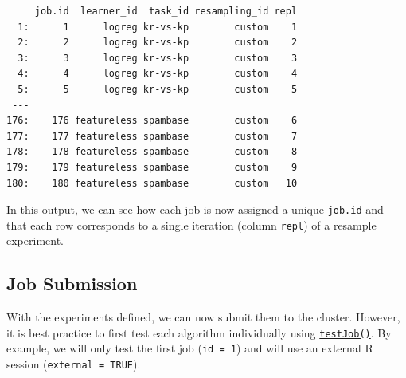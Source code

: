 \begin{Shaded}
\begin{Highlighting}[]
\OtherTok{=} \NormalTok{(}
\OtherTok{=} 
\OtherTok{=}\NormalTok{ job\_table[,}
\NormalTok{]}

\end{Highlighting}
\end{Shaded}

\begin{verbatim}
     job.id  learner_id  task_id resampling_id repl
  1:      1      logreg kr-vs-kp        custom    1
  2:      2      logreg kr-vs-kp        custom    2
  3:      3      logreg kr-vs-kp        custom    3
  4:      4      logreg kr-vs-kp        custom    4
  5:      5      logreg kr-vs-kp        custom    5
 ---                                               
176:    176 featureless spambase        custom    6
177:    177 featureless spambase        custom    7
178:    178 featureless spambase        custom    8
179:    179 featureless spambase        custom    9
180:    180 featureless spambase        custom   10
\end{verbatim}

In this output, we can see how each job is now assigned a unique
\texttt{job.id} and that each row corresponds to a single iteration
(column \texttt{repl}) of a resample experiment.

\hypertarget{sec-batchtools-submission}{%
\subsection{Job Submission}\label{sec-batchtools-submission}}

With the experiments defined, we can now submit them to the cluster.
However, it is best practice to first test each algorithm individually
using
\href{https://www.rdocumentation.org/packages/batchtools/topics/testJob}{\texttt{testJob()}}.
By example, we will only test the first job (\texttt{id\ =\ 1}) and will
use an external R session (\texttt{external\ =\ TRUE}).

\begin{Shaded}
\begin{Highlighting}[]
\OtherTok{=} \NormalTok{(}\NormalTok{, } \NormalTok{, }
\end{Highlighting}
\end{Shaded}

